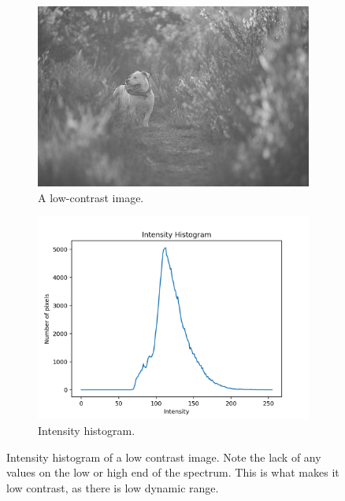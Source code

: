 \documentclass[11pt,a4paper]{article}
\begin{document}
\begin{figure}[ht]
	\centering
	\begin{subfigure}[h]{0.45\textwidth}
		\includegraphics[width=\textwidth]{figs/lc1_gray}
		\caption{A low-contrast image.}
		\label{fig:gray_lc1}
	\end{subfigure}
	\begin{subfigure}[h]{0.45\textwidth}
		\includegraphics[width=\textwidth]{figs/lc1_hist_bef}
		\caption{Intensity histogram.}
		\label{fig:lc1_hist_bef}
	\end{subfigure}
	\caption{Intensity histogram of a low contrast image. Note the lack of any values on the low or high end of the spectrum. This is what makes it low contrast, as there is low dynamic range.}
	\label{fig:lc1_hist}
\end{figure}
\end{document}
